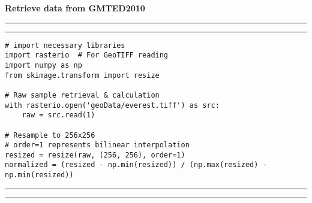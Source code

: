\textbf{\large{Retrieve data from GMTED2010}}
\vspace{2.5pt}
\hrule
\vspace{1mm}
\hrule
\begin{lstlisting}
# import necessary libraries
import rasterio  # For GeoTIFF reading
import numpy as np
from skimage.transform import resize

# Raw sample retrieval & calculation
with rasterio.open('geoData/everest.tiff') as src:
    raw = src.read(1)

# Resample to 256x256
# order=1 represents bilinear interpolation
resized = resize(raw, (256, 256), order=1)
normalized = (resized - np.min(resized)) / (np.max(resized) - np.min(resized))
\end{lstlisting}
\hrule
\vspace{1mm}
\hrule

